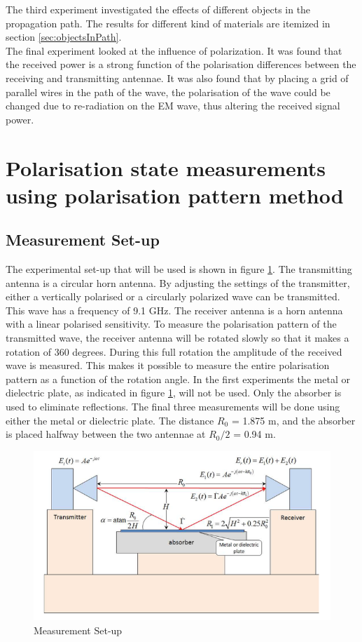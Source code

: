 \documentclass[11pt,a4paper]{article}
\begin{document}
The third experiment investigated the effects of different objects in the propagation path.
The results for different kind of materials are itemized in section \ref{sec:objectsInPath}.\\

The final experiment looked at the influence of polarization.
It was found that the received power is a strong function of the polarisation differences between the receiving and transmitting antennae.
It was also found that by placing a grid of parallel wires in the path of the wave, the polarisation of the wave could be changed due to re-radiation on the EM wave, thus 
altering the received signal power. 


\section{Polarisation state measurements using polarisation pattern method}

\subsection{Measurement Set-up}
The experimental set-up that will be used is shown in figure \ref{fig:exp_setup}. The transmitting antenna is a circular horn antenna. By adjusting the settings of the transmitter, either a vertically polarised or a circularly polarized wave can be transmitted. This wave has a frequency of 9.1 GHz. The receiver antenna is a horn antenna with a linear polarised sensitivity. To measure the polarisation pattern of the transmitted wave, the receiver antenna will be rotated slowly so that it makes a rotation of 360 degrees. During this full rotation the amplitude of the received wave is measured. This makes it possible to measure the entire polarisation pattern as a function of the rotation angle. In the first experiments the metal or dielectric plate, as indicated in figure \ref{fig:exp_setup}, will not be used. Only the absorber is used to eliminate reflections. The final three measurements will be done using either the metal or dielectric plate. The distance $R_0$ = 1.875 m, and the absorber is placed halfway between the two antennae at $R_0/2$ = 0.94 m.

\begin{figure}[H]
\begin{center}
\includegraphics[scale=0.5]{exp_setup.png}
\caption{Measurement Set-up}
\label{fig:exp_setup}
\end{center}
\end{figure}
\end{document}
